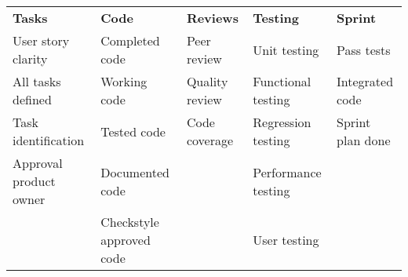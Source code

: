 \begin{tabular}{lllll}
	\textbf{Tasks} & \textbf{Code} & \textbf{Reviews} & \textbf{Testing} & \textbf{Sprint} \\
	User story clarity & Completed code & Peer review & Unit testing & Pass tests \\
	All tasks defined & Working code & Quality review & Functional testing & Integrated code \\
	Task identification & Tested code & Code coverage & Regression testing & Sprint plan done \\
	Approval product owner & Documented code &  & Performance testing & \\
	& Checkstyle approved code &  & User testing & \\
\end{tabular}